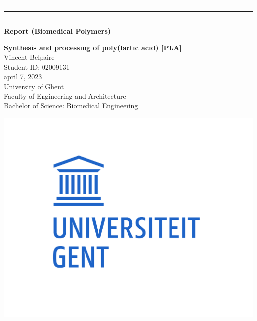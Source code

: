 {\color{ugent_blue} \hrule\hrule\hrule}

\vspace*{-0.43mm}
\colorbox{ugent_blue}{\color{white} \bf Report (Biomedical Polymers)}\\

\noindent\begin{minipage}{0.7\textwidth}%
{\LARGE \bf \color{ugent_blue} Synthesis and processing of poly(lactic acid) [PLA]}\\[2mm]

%
{\large Vincent Belpaire}\\
{Student ID: 02009131}\\
april 7, 2023\\


{\small University of Ghent}\\
{\small Faculty of Engineering and Architecture}\\
{\small Bachelor of Science: Biomedical Engineering}\\
\end{minipage}%
\hfill%
\begin{minipage}{0.3\textwidth}
\vspace{-2.2cm}
\begin{center}
\includegraphics[width=\linewidth]{ugent_logo}
\end{center}
\end{minipage}\\